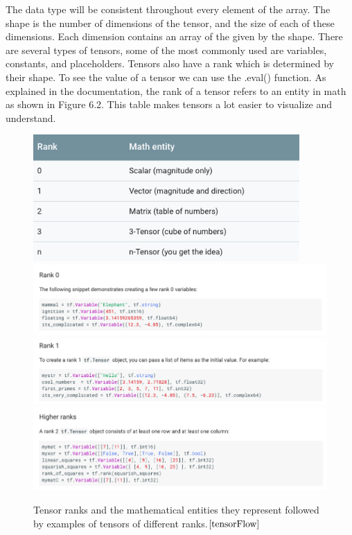 \documentclass[12pt]{report} %
\begin{document}
	The data type will be consistent throughout every element of the array. The shape is the number of dimensions of the tensor, and the size of each of these dimensions. Each dimension contains an array of the given by the shape. There are several types of tensors, some of the most commonly used are variables, constants, and placeholders. Tensors also have a rank which is determined by their shape. To see the value of a tensor we can use the .eval() function. As explained in the documentation, the rank of a tensor refers to an entity in math as shown in Figure 6.2. This table makes tensors a lot easier to visualize and understand\cite{tensorFlow}.
\begin{figure}
\centering
\includegraphics[width=4in]{tf_rank}
\includegraphics[width=7in]{rank0}
\includegraphics[width=7in]{rank2}
\includegraphics[width=7in]{rank1}
\caption{Tensor ranks and the mathematical entities they represent followed by examples of tensors of different ranks.$\cite{tensorFlow}$}
\end{figure}	
\end{document}
